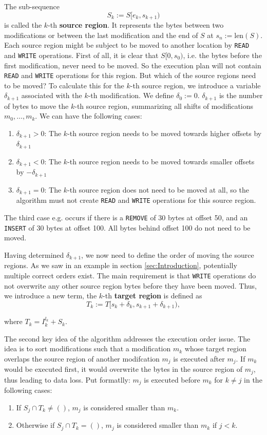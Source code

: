\documentclass[english, 10pt, openright, twocolumn, landscape, twoside, notitlepage, a4paper, pdftex]		
{article}
\begin{document}
The sub-sequence \[S_{k}:=S[e_{k},s_{k+1})\] is called the $k$-th \textbf{source region}. It represents the bytes between two modifications or between the last modification and the end of $S$ at $s_{n}:=\text{len}(S)$. Each source region might be subject to be moved to another location by \texttt{READ} and \texttt{WRITE} operations. First of all, it is clear that $S[0, s_{0})$, i.e. the bytes before the first modification, never need to be moved. So the execution plan will not contain \texttt{READ} and \texttt{WRITE} operations for this region. But which of the source regions need to be moved? To calculate this for the $k$-th source region, we introduce a variable $\delta_{k+1}$ associated with the $k$-th modification. We define $\delta_{0}:=0$. $\delta_{k+1}$ is the number of bytes to move the $k$-th source region, summarizing all shifts of modifications $m_{0},\ldots,m_{k}$. We can have the following cases:
\begin{enumerate}
\item $\delta_{k+1}>0$: The $k$-th source region needs to be moved towards higher offsets by $\delta_{k+1}$
\item $\delta_{k+1}<0$: The $k$-th source region needs to be moved towards smaller offsets by $-\delta_{k+1}$
\item $\delta_{k+1}=0$: The $k$-th source region does not need to be moved at all, so the algorithm must not create \texttt{READ} and \texttt{WRITE} operations for this source region.
\end{enumerate}

The third case e.g. occurs if there is a \texttt{REMOVE} of 30 bytes at offset 50, and an \texttt{INSERT} of 30 bytes at offset 100. All bytes behind offset 100 do not need to be moved.

Having determined $\delta_{k+1}$, we now need to define the order of moving the source regions. As we saw in an example in section \ref{sec:Introduction}, potentially multiple correct orders exist. The main requirement is that \texttt{WRITE} operations do not overwrite any other source region bytes before they have been moved. Thus, we introduce a new term, the $k$-th \textbf{target region} is defined as \[T_{k}:=T[s_{k}+\delta_{k},s_{k+1}+\delta_{k+1}),\]

where $T_{k}=I_{k}^{l_{k}}+S_{k}$.

The second key idea of the algorithm addresses the execution order issue. The idea is to sort modifications such that a modification $m_{k}$ whose target region overlaps the source region of another modifcation $m_{j}$ is executed after $m_{j}$. If $m_{k}$ would be executed first, it would overwrite the bytes in the source region of $m_{j}$, thus leading to data loss. Put formatlly: $m_{j}$ is executed before $m_{k}$ for $k\neq j$ in the following cases:
\begin{enumerate}
\item If $S_{j}\cap T_{k}\neq ()$, $m_{j}$ is considered smaller than $m_{k}$.
\item Otherwise if $S_{j}\cap T_{k}=()$, $m_{j}$ is considered smaller than $m_{k}$ if $j<k$.
\end{enumerate}
\end{document}
